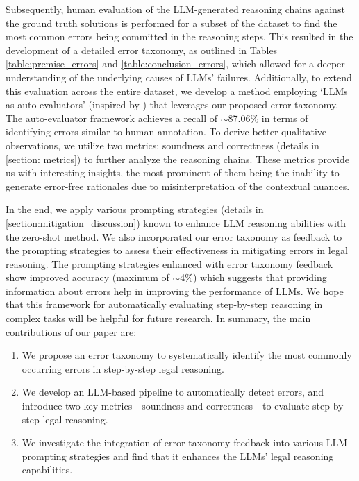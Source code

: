 Subsequently, human evaluation of the LLM-generated reasoning chains against the ground truth solutions is performed for a subset of the dataset to find the most common errors being committed in the reasoning steps. This resulted in the development of a detailed error taxonomy, as outlined in Tables \ref{table:premise_errors} and \ref{table:conclusion_errors}, which allowed for a deeper understanding of the underlying causes of LLMs' failures. Additionally, to extend this evaluation across the entire dataset, we develop a method employing `LLMs as auto-evaluators' (inspired by \citet{liu2023gevalnlgevaluationusing, chern2024largelanguagemodelstrusted}) that leverages our proposed error taxonomy. The auto-evaluator framework achieves a recall of $\sim$87.06$\%$ in terms of identifying errors similar to human annotation. To derive better qualitative observations, we utilize two metrics: soundness and correctness (details in \textsection \ref{section: metrics}) to further analyze the reasoning chains. These metrics provide us with interesting insights, the most prominent of them being the inability to generate error-free rationales due to misinterpretation of the contextual nuances.

In the end, we apply various prompting strategies (details in \textsection \ref{section:mitigation_discussion}) known to enhance LLM reasoning abilities with the zero-shot method. We also incorporated our error taxonomy as feedback to the prompting strategies to assess their effectiveness in mitigating errors in legal reasoning. The prompting strategies enhanced with error taxonomy feedback show improved accuracy (maximum of $\sim$4$\%$) which suggests that providing information about errors help in improving the performance of LLMs. We hope that this framework for automatically evaluating step-by-step reasoning in complex tasks will be helpful for future research. In summary, the main contributions of our paper are: 
\begin{enumerate}[noitemsep]
    \item We propose an error taxonomy to systematically identify the most commonly occurring errors in step-by-step legal reasoning.
    \item We develop an LLM-based pipeline to automatically detect errors, and introduce two key metrics—soundness and correctness—to evaluate step-by-step legal reasoning.
    
    \item We investigate the integration of error-taxonomy feedback into various LLM prompting strategies and find that it enhances the LLMs' legal reasoning capabilities.
\end{enumerate}

